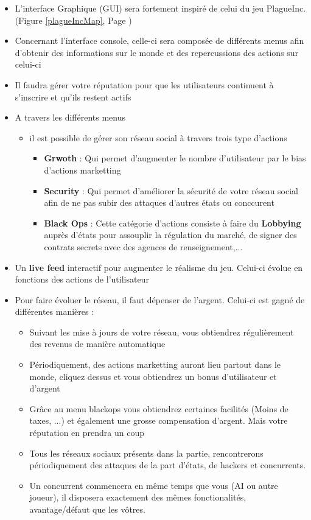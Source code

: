\begin{itemize}
    \item L'interface Graphique (GUI) sera fortement inspiré de celui du jeu PlagueInc. (Figure \ref{plagueIncMap}, Page \pageref{plagueIncMap})
    \item Concernant l'interface console, celle-ci sera composée de différents menus afin d'obtenir des informations sur le monde et des repercussions des actions sur celui-ci
    
    \item Il faudra gérer votre réputation pour que les utilisateurs continuent à s'inscrire et qu'ils restent actifs
    
    \item A travers les différents menus
    
    \begin{itemize}
        \item il est possible de gérer son réseau social à travers trois type d'actions
    
        \begin{itemize}
            \item \textbf{Grwoth} : Qui permet d'augmenter le nombre d'utilisateur par le bias d'actions marketting
            \item \textbf{Security} : Qui permet d'améliorer la sécurité de votre réseau social afin de ne pas subir des attaques d'autres états ou conccurent
            \item \textbf{Black Ops} : Cette catégorie d'actions consiste à faire du \textbf{Lobbying} auprès d'états pour assouplir la régulation du marché, de signer des contrats secrets avec des agences de renseignement,...
        \end{itemize}
        \end{itemize}
        \item{Un \textbf{live feed} interactif pour augmenter le réalisme du jeu. Celui-ci évolue en fonctions des actions de l'utilisateur}
        \item Pour faire évoluer le réseau, il faut dépenser de l'argent. Celui-ci est gagné de différentes manières : 
        \begin{itemize}
            \item Suivant les mise à jours de votre réseau, vous obtiendrez régulièrement des revenus de manière automatique
            \item Périodiquement, des actions marketting auront lieu partout dans le monde, cliquez dessus et vous obtiendrez un bonus d'utilisateur et d'argent
            \item Grâce au menu blackops vous obtiendrez certaines facilités (Moins de taxes, ...) et également une grosse compensation d'argent. Mais votre réputation en prendra un coup
        \item Tous les réseaux sociaux présents dans la partie, rencontrerons périodiquement des attaques de la part d'états, de hackers et concurrents.
        \item Un concurrent commencera en même temps que vous (AI ou autre joueur), il disposera exactement des mêmes fonctionalités, avantage/défaut que les vôtres.
    \end{itemize}
    

\end{itemize}
